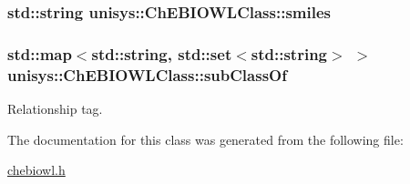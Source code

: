 \hypertarget{classunisys_1_1ChEBIOWLClass_ad36fc8f28f36623552de31e77095e570}{
\subsubsection[{smiles}]{\setlength{\rightskip}{0pt plus 5cm}std\-::string unisys\-::\-Ch\-E\-B\-I\-O\-W\-L\-Class\-::smiles\hspace{0.3cm}{\ttfamily [private]}}}\label{classunisys_1_1ChEBIOWLClass_ad36fc8f28f36623552de31e77095e570}
\hypertarget{classunisys_1_1ChEBIOWLClass_afac1eca0e61d1adcebd6d1feda765a63}{
\subsubsection[{sub\-Class\-Of}]{\setlength{\rightskip}{0pt plus 5cm}std\-::map$<$std\-::string, std\-::set$<$std\-::string$>$ $>$ unisys\-::\-Ch\-E\-B\-I\-O\-W\-L\-Class\-::sub\-Class\-Of\hspace{0.3cm}{\ttfamily [private]}}}\label{classunisys_1_1ChEBIOWLClass_afac1eca0e61d1adcebd6d1feda765a63}


Relationship tag. 



The documentation for this class was generated from the following file\-:\begin{DoxyCompactItemize}
\item 
\hyperlink{chebiowl_8h}{chebiowl.\-h}\end{DoxyCompactItemize}
